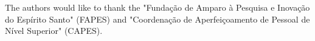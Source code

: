 The authors would like to thank the "Funda\c c\~ ao de Amparo \`a Pesquisa e Inova\c c\~ ao do Esp\'irito Santo" (FAPES) and "Coordena\c c\~ ao de Aperfei\c coamento de Pessoal de N\'ivel Superior" (CAPES).